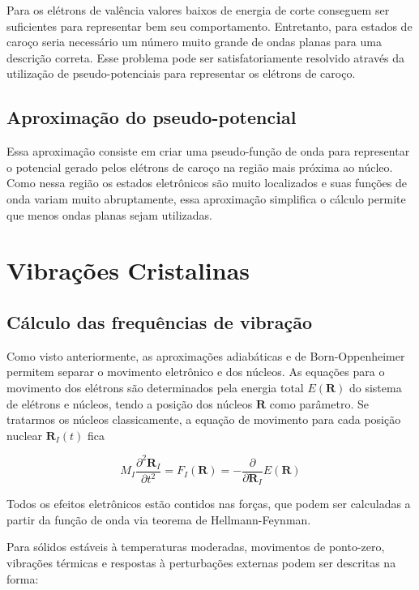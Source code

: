 		Para os elétrons de valência valores baixos de energia de corte conseguem ser suficientes para representar bem seu comportamento. Entretanto, para estados de caroço seria necessário um número muito grande de ondas planas para uma descrição correta. Esse problema pode ser satisfatoriamente resolvido através da utilização de pseudo-potenciais para representar os elétrons de caroço.  
	
	\subsection{Aproximação do pseudo-potencial}
	
		Essa aproximação consiste em criar uma pseudo-função de onda para representar o potencial gerado pelos elétrons de caroço na região mais próxima ao núcleo. Como nessa região os estados eletrônicos são muito localizados e suas funções de onda variam muito abruptamente, essa aproximação simplifica o cálculo permite que menos ondas planas sejam utilizadas. 

\section{Vibrações Cristalinas}

	\subsection{Cálculo das frequências de vibração}

	Como visto anteriormente, as aproximações adiabáticas e de Born-Oppenheimer permitem separar o movimento eletrônico e dos núcleos. As equações para o movimento dos elétrons são determinados pela energia total $E(\mathbf{R})$ do sistema de elétrons e núcleos, tendo a posição dos núcleos $\mathbf{R}$ como parâmetro. Se tratarmos os núcleos classicamente, a equação de movimento para cada posição nuclear $\mathbf{R}_I(t)$ fica
	
	\begin{equation}
		\label{fonon_1}
		M_I \frac{\partial^2\mathbf{R}_I}{\partial t^2} = F_I(\mathbf{R}) = -\frac{\partial}{\partial \mathbf{R}_I}E(\mathbf{R})
	\end{equation}
	
	Todos os efeitos eletrônicos estão contidos nas forças, que podem ser calculadas a partir da função de onda via teorema de Hellmann-Feynman. 
	
	Para sólidos estáveis à temperaturas moderadas, movimentos de ponto-zero, vibrações térmicas e respostas à perturbações externas podem ser descritas na forma:
	
